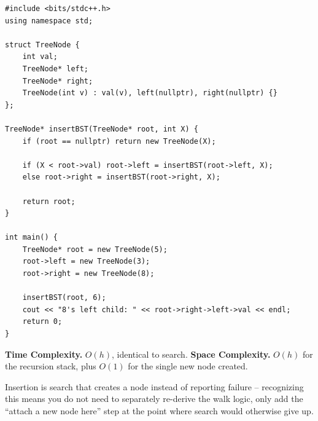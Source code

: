 \begin{lstlisting}
#include <bits/stdc++.h>
using namespace std;

struct TreeNode {
    int val;
    TreeNode* left;
    TreeNode* right;
    TreeNode(int v) : val(v), left(nullptr), right(nullptr) {}
};

TreeNode* insertBST(TreeNode* root, int X) {
    if (root == nullptr) return new TreeNode(X);

    if (X < root->val) root->left = insertBST(root->left, X);
    else root->right = insertBST(root->right, X);

    return root;
}

int main() {
    TreeNode* root = new TreeNode(5);
    root->left = new TreeNode(3);
    root->right = new TreeNode(8);

    insertBST(root, 6);
    cout << "8's left child: " << root->right->left->val << endl;
    return 0;
}
\end{lstlisting}

\begin{complexitybox}
\textbf{Time Complexity.} $O(h)$, identical to search.
\textbf{Space Complexity.} $O(h)$ for the recursion stack, plus $O(1)$
for the single new node created.
\end{complexitybox}

\begin{takeawaybox}
Insertion is search that creates a node instead of reporting failure --
recognizing this means you do not need to separately re-derive the walk
logic, only add the ``attach a new node here'' step at the point where
search would otherwise give up.
\end{takeawaybox}
